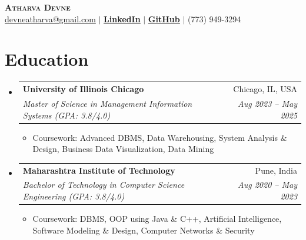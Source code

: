 \documentclass[Sans-serif,10.5 pt]{article}
\makeatletter
\newcommand{\resumeItem}[1]{
  \item\justifying\small{
    {#1 \vspace{-2pt}}
  }
}
\newcommand{\resumeSubheading}[4]{
  \vspace{-1pt}\item
    \begin{tabular*}{0.97\textwidth}[t]{l@{\extracolsep{\fill}}r}
      \textbf{#1} & #2 \\
      \textit{\small#3} & \textit{\small #4} \\
    \end{tabular*}\vspace{-4pt}
}
\newcommand{\resumeSubHeadingListStart}{\begin{itemize}[leftmargin=0in, label={}]}
\newcommand{\resumeSubHeadingListEnd}{\end{itemize}}
\newcommand{\resumeItemListStart}{\begin{itemize}}
\newcommand{\resumeItemListEnd}{\end{itemize}\vspace{-5pt}}
\makeatother
\begin{document}
\vspace{-2mm}
\begin{center}
    \textbf{\Huge \scshape Atharva Devne} \\ \vspace{1pt}
    \href{mailto:devneatharva@gmail.com}{{devneatharva@gmail.com}} $|$
    \href{https://www.linkedin.com/in/atharvadevne}{\textbf{\underline{LinkedIn}}} $|$
    \href{https://github.com/atharvadevne123}{\textbf{\underline{GitHub}}} $|$
    \small (773) 949-3294
\end{center}
\vspace{-4.5mm}

\vspace{-1mm}
\section{Education}
  \resumeSubHeadingListStart
    \resumeSubheading
      {University of Illinois Chicago}{Chicago, IL, USA}
      {Master of Science in Management Information Systems (GPA: 3.8/4.0)}{Aug 2023 -- May 2025}
      \resumeItemListStart
        \resumeItem{Coursework: Advanced DBMS, Data Warehousing, System Analysis \& Design, Business Data Visualization, Data Mining}
      \resumeItemListEnd
    \resumeSubheading
      {Maharashtra Institute of Technology}{Pune, India}
      {Bachelor of Technology in Computer Science Engineering (GPA: 3.8/4.0)}{Aug 2020 -- May 2023}
      \resumeItemListStart
        \resumeItem{Coursework: DBMS, OOP using Java \& C++, Artificial Intelligence, Software Modeling \& Design, Computer Networks \& Security}
      \resumeItemListEnd\vspace{-0.5mm}
  \resumeSubHeadingListEnd

\vspace{-2.75mm}
\end{document}
